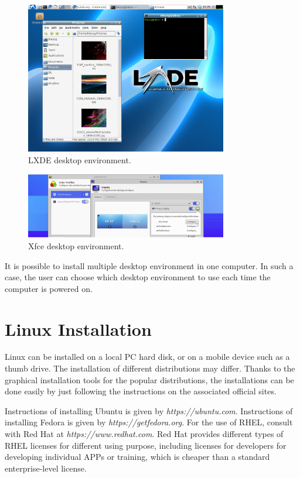 \begin{figure}
	\centering
	\includegraphics[width=250pt]{chapters/ch-brief-introduction-to-linux/figures/lxde_demo.png}
	\caption{LXDE desktop environment.} \label{ch:bitl:fig:lxdedemo}
\end{figure}

\begin{figure}
	\centering
	\includegraphics[width=250pt]{chapters/ch-brief-introduction-to-linux/figures/xfce_demo.png}
	\caption{Xfce desktop environment.} \label{ch:bitl:fig:xfcedemo}
\end{figure}

It is possible to install multiple desktop environment in one computer. In such a case, the user can choose which desktop environment to use each time the computer is powered on.

\section{Linux Installation}

Linux can be installed on a local PC hard disk, or on a mobile device such as a thumb drive. The installation of different distributions may differ. Thanks to the graphical installation tools for the popular distributions, the installations can be done easily by just following the instructions on the associated official sites.

Instructions of installing Ubuntu is given by \textit{https://ubuntu.com}. Instructions of installing Fedora is given by \textit{https://getfedora.org}. For the use of RHEL, consult with Red Hat at \textit{https://www.redhat.com}. Red Hat provides different types of RHEL licenses for different using purpose, including licenses for developers for developing individual APPs or training, which is cheaper than a standard enterprise-level license.
